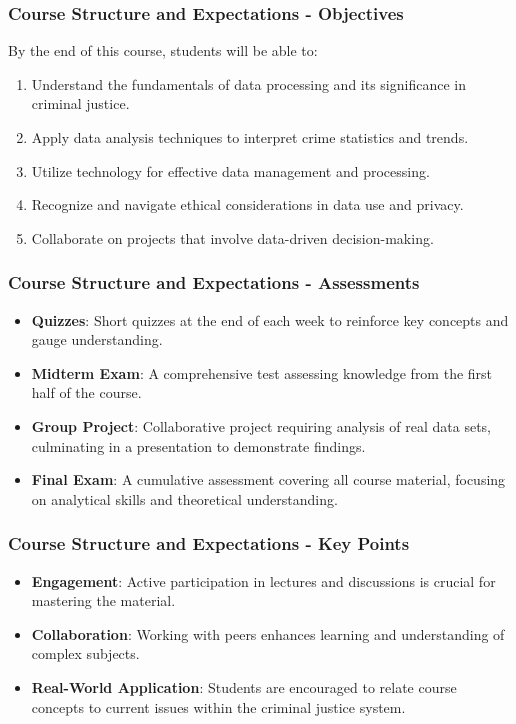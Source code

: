 \documentclass[aspectratio=169]{beamer}
\begin{document}
\begin{frame}[fragile]
    \frametitle{Course Structure and Expectations - Objectives}
    By the end of this course, students will be able to:
    \begin{enumerate}
        \item Understand the fundamentals of data processing and its significance in criminal justice.
        \item Apply data analysis techniques to interpret crime statistics and trends.
        \item Utilize technology for effective data management and processing.
        \item Recognize and navigate ethical considerations in data use and privacy.
        \item Collaborate on projects that involve data-driven decision-making.
    \end{enumerate}
\end{frame}

\begin{frame}[fragile]
    \frametitle{Course Structure and Expectations - Assessments}
    \begin{itemize}
        \item \textbf{Quizzes}: Short quizzes at the end of each week to reinforce key concepts and gauge understanding.
        \item \textbf{Midterm Exam}: A comprehensive test assessing knowledge from the first half of the course.
        \item \textbf{Group Project}: Collaborative project requiring analysis of real data sets, culminating in a presentation to demonstrate findings.
        \item \textbf{Final Exam}: A cumulative assessment covering all course material, focusing on analytical skills and theoretical understanding.
    \end{itemize}
\end{frame}

\begin{frame}[fragile]
    \frametitle{Course Structure and Expectations - Key Points}
    \begin{itemize}
        \item \textbf{Engagement}: Active participation in lectures and discussions is crucial for mastering the material.
        \item \textbf{Collaboration}: Working with peers enhances learning and understanding of complex subjects.
        \item \textbf{Real-World Application}: Students are encouraged to relate course concepts to current issues within the criminal justice system.
    \end{itemize}
\end{frame}
\end{document}
